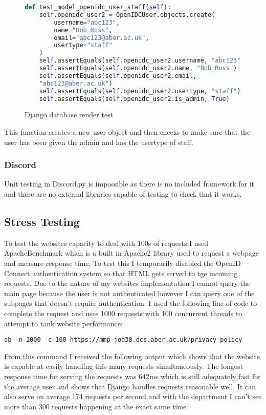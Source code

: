 \begin{figure}[H]
\begin{lstlisting}[language=Python]
def test_model_openidc_user_staff(self):
    self.openidc_user2 = OpenIDCUser.objects.create(
        username="abc123",
        name="Bob Ross",
        email="abc123@aber.ac.uk",
        usertype="staff"
    )
    self.assertEquals(self.openidc_user2.username, "abc123")
    self.assertEquals(self.openidc_user2.name, "Bob Ross")
    self.assertEquals(self.openidc_user2.email, 
    "abc123@aber.ac.uk")
    self.assertEquals(self.openidc_user2.usertype, "staff")
    self.assertEquals(self.openidc_user2.is_admin, True)
\end{lstlisting}
\caption{Django database render test}
\label{fig:django-database}
\end{figure}
This function creates a new user object and then checks to make sure that the user has been given the admin and has the usertype of staff.

\subsubsection{Discord}
Unit testing in Discord.py is impossible as there is no included framework for it and there are no external libraries capable of testing to check that it works.

\subsection{Stress Testing}
To test the websites capacity to deal with 100s of requests I used ApacheBenchmark \cite{apacheBenchmark} which is a built in Apache2 \cite{apache2} library used to request a webpage and measure response time. To test this I temporarily disabled the OpenID Connect \cite{OpenID} authentication system so that HTML gets served to tge incoming requests. Due to the nature of my websites implementation I cannot query the main page because the user is not authenticated however I can query one of the subpages that doesn't require authentication. I used the following line of code to complete the request and uses 1000 requests with 100 concurrent threads to attempt to tank website performance:

\verb|ab -n 1000 -c 100 https://mmp-joa38.dcs.aber.ac.uk/privacy-policy|

From this command I received the following output which shows that the website is capable at easily handling this many requests simultaneously. The longest response time for serving the requests was 642ms which is still adequately fast for the average user and shows that Django handles requests reasonable well. It can also serve on average 174 requests per second and with the department I can't see more than 300 requests happening at the exact same time.

